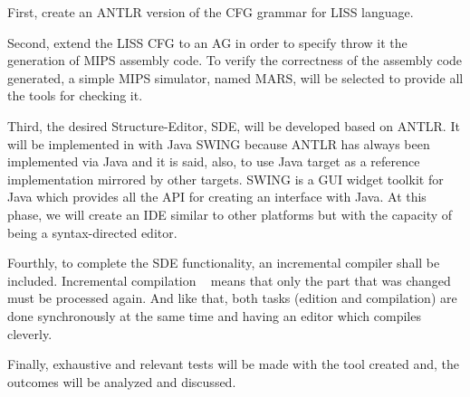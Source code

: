 \documentclass[
  oneside,
  11pt, a4paper,
  footinclude=true,
  headinclude=true,
  cleardoublepage=empty
]{scrbook}
\begin{document}
First, create an ANTLR version of the CFG grammar for LISS language.


Second, extend the LISS CFG to an AG in order to specify throw it the generation of MIPS assembly code.
To verify the correctness of the assembly code generated, a simple MIPS simulator, named MARS, will be selected to provide all the tools for checking it.

Third, the desired Structure-Editor, SDE, will be developed based on ANTLR.
It will be implemented in with Java SWING because ANTLR has always been implemented via Java and it is said, also, to use Java target as a reference implementation mirrored by other targets.
SWING is a GUI widget toolkit for Java which provides all the API for creating an interface with Java.
At this phase, we will create an IDE similar to other platforms but with the capacity of being a syntax-directed editor.

Fourthly, to complete the SDE functionality, an incremental compiler shall be included.
Incremental compilation ~\citep{RTD83a,Hol87a,VSK90a} means that only the part that was changed must be processed again. And like that, both tasks (edition and compilation) are done synchronously at the same time and having an editor which compiles cleverly.

Finally, exhaustive and relevant tests will be made with the tool created and, the outcomes will be analyzed and discussed.







\end{document}
